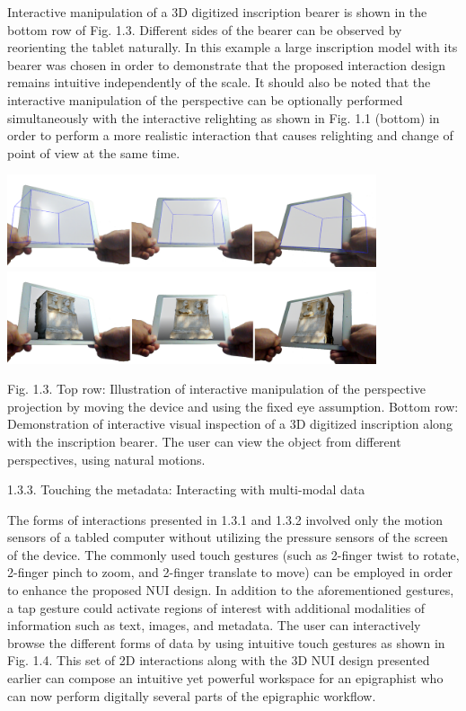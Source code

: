 \documentclass[amsthm,ebook]{saparticle}
\begin{document}
Interactive manipulation of a 3D digitized inscription bearer is shown in the bottom row of Fig. 1.3. Different sides of
the bearer can be observed by reorienting the tablet naturally. In this example a large inscription model with its
bearer was chosen in order to demonstrate that the proposed interaction design remains intuitive independently of the
scale. It should also be noted that the interactive manipulation of the perspective can be optionally performed
simultaneously with the interactive relighting as shown in Fig. 1.1 (bottom) in order to perform a more realistic
interaction that causes relighting and change of point of view at the same time. \ \ \ 


\bigskip

 \includegraphics[width=10.881cm,height=2.72cm]{EAGLE2016cameraready-img004.png} 
\includegraphics[width=10.881cm,height=2.72cm]{EAGLE2016cameraready-img005.png} 

Fig. 1.3. Top row: Illustration of interactive manipulation of the perspective projection by moving the device and using
the {\textquotedbl}fixed eye{\textquotedbl} assumption. Bottom row: Demonstration of interactive visual inspection of a
3D digitized inscription along with the inscription bearer. The user can view the object from different perspectives,
using natural motions. \ 


\bigskip

1.3.3. {\textquotedbl}Touching{\textquotedbl} the metadata: Interacting with multi-modal data

The forms of interactions presented in 1.3.1 and 1.3.2 involved only the motion sensors of a tabled computer without
utilizing the pressure sensors of the screen of the device. The commonly used touch gestures (such as 2-finger twist to
rotate, 2-finger pinch to zoom, and 2-finger translate to move) can be employed in order to enhance the proposed NUI
design. In addition to the aforementioned gestures, a tap gesture could activate regions of interest with additional
modalities of information such as text, images, and metadata. The user can interactively browse the different forms of
data by using intuitive touch gestures as shown in Fig. 1.4. This set of 2D interactions along with the 3D NUI design
presented earlier can compose an intuitive yet powerful workspace for an epigraphist who can now perform digitally
several parts of the epigraphic workflow. \ 
\end{document}
